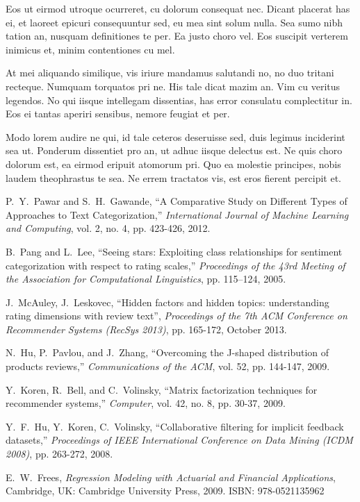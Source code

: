 \documentclass[a4paper,twoside]{article}
\begin{document}
Eos ut eirmod utroque ocurreret, cu dolorum consequat nec. Dicant placerat has ei, et laoreet epicuri consequuntur sed, eu mea sint solum nulla. Sea sumo nibh tation an, nusquam definitiones te per. Ea justo choro vel. Eos suscipit verterem inimicus et, minim contentiones cu mel.

\newpage

At mei aliquando similique, vis iriure mandamus salutandi no, no duo tritani recteque. Numquam torquatos pri ne. His tale dicat mazim an. Vim cu veritus legendos. No qui iisque intellegam dissentias, has error consulatu complectitur in. Eos ei tantas aperiri sensibus, nemore feugiat et per.

\newpage

Modo lorem audire ne qui, id tale ceteros deseruisse sed, duis legimus inciderint sea ut. Ponderum dissentiet pro an, ut adhuc iisque delectus est. Ne quis choro dolorum est, ea eirmod eripuit atomorum pri. Quo ea molestie principes, nobis laudem theophrastus te sea. Ne errem tractatos vis, est eros fierent percipit et.

\newpage
\begin{thebibliography}{00}
	
	
	P.~Y.~Pawar and S.~H.~Gawande, ``A Comparative Study on Different Types of Approaches to Text Categorization,'' \textit{International Journal of Machine Learning and Computing}, vol. 2, no. 4, pp. 423-426, 2012.
	
	B.~Pang and L.~Lee, ``Seeing stars: Exploiting class relationships for sentiment categorization with respect to rating scales,'' \textit{Proceedings of the 43rd Meeting of the Association for Computational Linguistics}, pp. 115–124, 2005.
	
	J.~McAuley, J.~Leskovec, ``Hidden factors and hidden topics: understanding rating dimensions with review text'', \textit{Proceedings of the 7th ACM Conference on Recommender Systems (RecSys 2013)}, pp. 165-172, October 2013.
	
	N.~Hu, P.~Pavlou, and J.~Zhang, ``Overcoming the J-shaped distribution of products reviews,'' \textit{Communications of the ACM}, vol. 52, pp. 144-147, 2009. 
	
	Y.~Koren, R.~Bell, and C.~Volinsky, ``Matrix factorization techniques for recommender systems,'' \textit{Computer}, vol. 42, no. 8, pp. 30-37, 2009.
	
	Y.~F.~Hu, Y.~Koren, C.~Volinsky, ``Collaborative filtering for implicit feedback datasets,'' \textit{Proceedings of IEEE International Conference on Data Mining (ICDM 2008)}, pp. 263-272, 2008.
	
	E.~W.~Frees, \textit{Regression Modeling with Actuarial and Financial Applications}, Cambridge, UK: Cambridge University Press, 2009. ISBN: 978-0521135962
	
\end{thebibliography}
\end{document}

